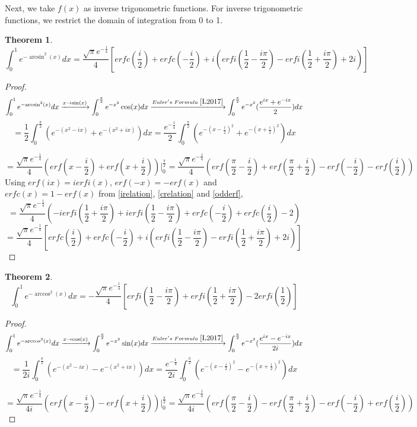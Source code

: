 \documentclass[a4paper,twoside,10pt]{article}
\newtheorem{theorem}{Theorem}[section]
\begin{document}
Next, we take $f(x)$ as inverse trigonometric functions. For inverse trigonometric functions, we restrict the domain of integration from 0 to 1.

 \begin{theorem}
\begin{equation}\label{arcsineqn}
 \int_0^{1} e^{-{\arcsin^2(x)}} dx = \frac{\sqrt{\pi} e^{-\frac{1}{4}}}{4} \left[ erfc(\frac{i}{2}) + erfc(-\frac{i}{2}) + i \left( erfi(\frac{1}{2}-\frac{i\pi}{2}) -erfi(\frac{1}{2}+\frac{i \pi}{2}) +2i \right)  \right] 
\end{equation}
\end{theorem}
\begin{proof}
\[ \int_0^{1} e^{-{\arcsin^2(x)}} dx \xrightarrow{x\rightarrow \sin(x) } \int_0^{\frac{\pi}{2}} e^{-x^2} \cos(x) dx \xrightarrow{Euler's\,\, Formula\,\, \cite{L2017}} \int_0^{\frac{\pi}{2}} e^{-x^2}(\frac{e^{ix}+e^{-ix}}{2}) dx \]
\[=\frac{1}{2} \int_0^{ \frac{\pi}{2}} \left( e^{-(x^2-ix)}+ e^{-(x^2+ix)} \right) dx = \frac{e^{-\frac{1}{4}}}{2} \int_0^{ \frac{\pi}{2}} \left( e^{-(x-\frac{i}{2})^2}+ e^{-(x+\frac{i}{2})^2} \right) dx \]

\[ =\frac{\sqrt{\pi}e^{-\frac{1}{4}}}{4}  \left( erf(x-\frac{i}{2}) + erf(x+\frac{i}{2}) \right) \Big|_0^{\frac{\pi}{2}} = \frac{\sqrt{\pi} e^{-\frac{1}{4}} }{4}  \left( erf(\frac{\pi}{2}-\frac{i}{2}) + erf(\frac{\pi}{2}+\frac{i}{2}) - erf(-\frac{i}{2})-erf(\frac{i}{2}) \right) \]
 Using  $erf(ix) = ierfi(x)$, $erf(-x) = -erf(x)$ and $erfc(x) = 1-erf(x)$ from \eqref{irelation}, \eqref{crelation}  and   \eqref{odderf},  
\[  = \frac{\sqrt{\pi} e^{-\frac{1}{4}} }{4}  \left( - i erfi(\frac{1}{2}+\frac{i \pi}{2}) +i erfi(\frac{1}{2}-\frac{i \pi}{2}) + erfc(-\frac{i}{2})+erfc(\frac{i}{2}) -2 \right)
\]
\[  = \frac{\sqrt{\pi} e^{-\frac{1}{4}} }{4}  \left[ erfc(\frac{i}{2}) + erfc(-\frac{i}{2}) + i \left( erfi(\frac{1}{2}-\frac{i \pi}{2}) -erfi(\frac{1}{2}+\frac{i \pi}{2})+2i \right) \right] \,\,  
\]
\end{proof}
\begin{theorem}
\begin{equation}\label{arccoseqn}
 \int_0^{1} e^{-{\arccos^2(x)}} dx = -\frac{\sqrt{\pi} e^{-\frac{1}{4}}}{4} \left[  erfi(\frac{1}{2}-\frac{i\pi}{2}) + erfi(\frac{1}{2}+\frac{i \pi}{2}) -2erfi(\frac{1}{2}) \right] 
\end{equation}
\end{theorem}
\begin{proof}
\[ \int_0^{1} e^{-{\arccos^2(x)}} dx \xrightarrow{x\rightarrow \cos(x) } \int_0^{\frac{\pi}{2}} e^{-x^2} \sin(x) dx \xrightarrow{Euler's  \,\, Formula \,\, \cite{L2017}} \int_0^{\frac{\pi}{2}} e^{-x^2}(\frac{e^{ix}-e^{-ix}}{2i}) dx \]
\[=\frac{1}{2i} \int_0^{ \frac{\pi}{2}} \left( e^{-(x^2-ix)}- e^{-(x^2+ix)} \right) dx = \frac{e^{-\frac{1}{4}}}{2i} \int_0^{ \frac{\pi}{2}} \left( e^{-(x-\frac{i}{2})^2}- e^{-(x+\frac{i}{2})^2} \right) dx \]

\[ =\frac{\sqrt{\pi}e^{-\frac{1}{4}}}{4i}  \left( erf(x-\frac{i}{2}) - erf(x+\frac{i}{2}) \right) \Big|_0^{\frac{\pi}{2}} = \frac{\sqrt{\pi} e^{-\frac{1}{4}} }{4i}  \left( erf(\frac{\pi}{2}-\frac{i}{2}) - erf(\frac{\pi}{2}+\frac{i}{2}) - erf(-\frac{i}{2})+erf(\frac{i}{2}) \right) \]
\end{proof}
\end{document}
